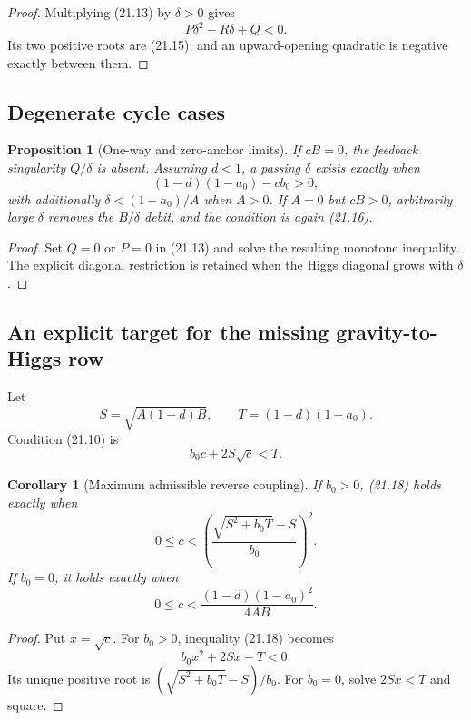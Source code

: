 \documentclass[11pt]{article}
\newtheorem{proposition}[theorem]{Proposition}
\newtheorem{corollary}[theorem]{Corollary}
\theoremstyle{remark}
\begin{document}
\begin{proof}
Multiplying (21.13) by \(\delta>0\) gives
\[
 P\delta^2-R\delta+Q<0.
\]
Its two positive roots are (21.15), and an upward-opening
quadratic is negative exactly between them.
\end{proof}

\subsection{Degenerate cycle cases}

\begin{proposition}[One-way and zero-anchor limits]
\label{prop:v17v21-degenerate}
If \(cB=0\), the feedback singularity \(Q/\delta\) is absent.
Assuming \(d<1\), a passing \(\delta\) exists exactly when
\[
 (1-d)(1-a_0)-cb_0>0,                              \tag{21.16}
\]
with additionally \(\delta<(1-a_0)/A\) when \(A>0\).
If \(A=0\) but \(cB>0\), arbitrarily large \(\delta\) removes the
\(B/\delta\) debit, and the condition is again (21.16).
\end{proposition}

\begin{proof}
Set \(Q=0\) or \(P=0\) in (21.13) and solve the resulting monotone
inequality.  The explicit diagonal restriction is retained when
the Higgs diagonal grows with \(\delta\).
\end{proof}

\subsection{An explicit target for the missing gravity-to-Higgs row}

Let
\[
 S=\sqrt{A(1-d)B},\qquad
 T=(1-d)(1-a_0).                                   \tag{21.17}
\]
Condition (21.10) is
\[
 b_0c+2S\sqrt c<T.                                 \tag{21.18}
\]

\begin{corollary}[Maximum admissible reverse coupling]
\label{cor:v17v21-cmax}
If \(b_0>0\), (21.18) holds exactly when
\[
\boxed{
 0\leq c<
 \left(
 \frac{\sqrt{S^2+b_0T}-S}{b_0}
 \right)^2.}                                       \tag{21.19}
\]
If \(b_0=0\), it holds exactly when
\[
\boxed{
 0\leq c<
 \frac{(1-d)(1-a_0)^2}{4AB}.}                      \tag{21.20}
\]
\end{corollary}

\begin{proof}
Put \(x=\sqrt c\).  For \(b_0>0\), inequality (21.18) becomes
\[
 b_0x^2+2Sx-T<0.
\]
Its unique positive root is
\((\sqrt{S^2+b_0T}-S)/b_0\).  For \(b_0=0\), solve
\(2Sx<T\) and square.
\end{proof}
\end{document}
